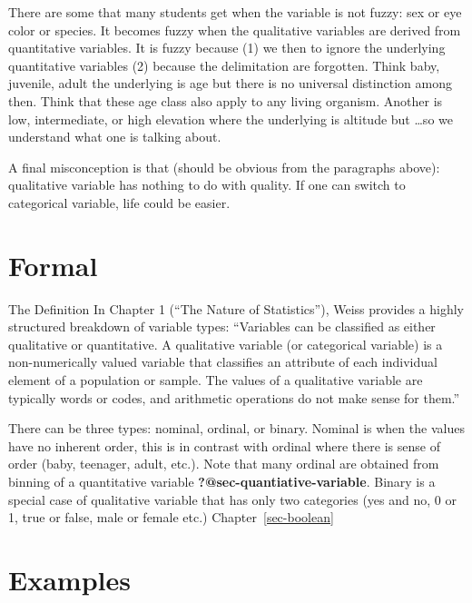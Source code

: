 \documentclass[
  letterpaper,
  DIV=11,
  numbers=noendperiod]{scrreprt}
\begin{document}
There are some that many students get when the variable is not fuzzy:
sex or eye color or species. It becomes fuzzy when the qualitative
variables are derived from quantitative variables. It is fuzzy because
(1) we then to ignore the underlying quantitative variables (2) because
the delimitation are forgotten. Think baby, juvenile, adult the
underlying is age but there is no universal distinction among then.
Think that these age class also apply to any living organism. Another is
low, intermediate, or high elevation where the underlying is altitude
but \ldots so we understand what one is talking about.

A final misconception is that (should be obvious from the paragraphs
above): qualitative variable has nothing to do with quality. If one can
switch to categorical variable, life could be easier.

\section*{Formal}\label{formal-17}


The Definition In Chapter 1 (``The Nature of Statistics''), Weiss
provides a highly structured breakdown of variable types: ``Variables
can be classified as either qualitative or quantitative. A qualitative
variable (or categorical variable) is a non-numerically valued variable
that classifies an attribute of each individual element of a population
or sample. The values of a qualitative variable are typically words or
codes, and arithmetic operations do not make sense for them.''

There can be three types: nominal, ordinal, or binary. Nominal is when
the values have no inherent order, this is in contrast with ordinal
where there is sense of order (baby, teenager, adult, etc.). Note that
many ordinal are obtained from binning of a quantitative variable
\textbf{?@sec-quantiative-variable}. Binary is a special case of
qualitative variable that has only two categories (yes and no, 0 or 1,
true or false, male or female etc.) Chapter~\ref{sec-boolean}

\section*{Examples}\label{examples-16}

\end{document}
